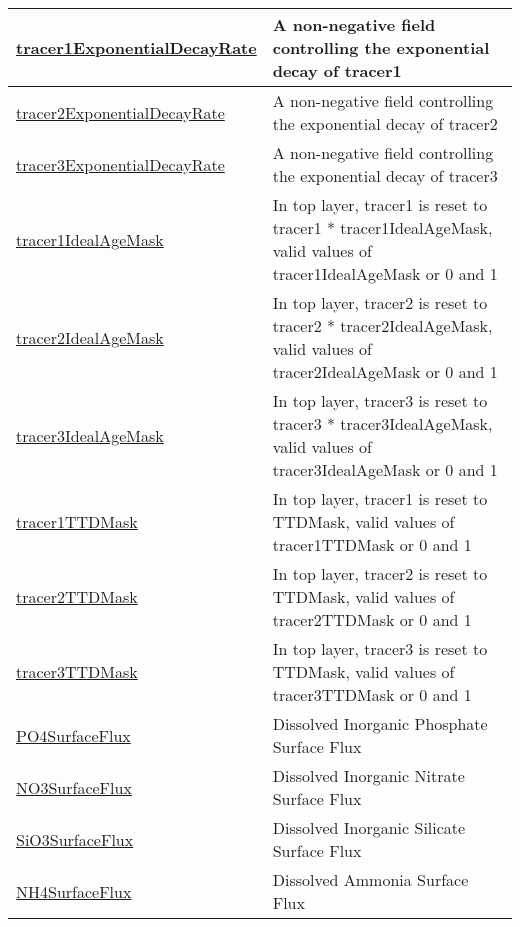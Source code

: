 {\begin{center}
\begin{longtable}{| p{2.0in} | p{4.0in} |}
    \hline
    \hyperref[subsec:var_sec_forcing_tracer1ExponentialDecayRate]{tracer1ExponentialDecayRate} & A non-negative field controlling the exponential decay of tracer1 \\
    \hline
    \hyperref[subsec:var_sec_forcing_tracer2ExponentialDecayRate]{tracer2ExponentialDecayRate} & A non-negative field controlling the exponential decay of tracer2 \\
    \hline
    \hyperref[subsec:var_sec_forcing_tracer3ExponentialDecayRate]{tracer3ExponentialDecayRate} & A non-negative field controlling the exponential decay of tracer3 \\
    \hline
    \hyperref[subsec:var_sec_forcing_tracer1IdealAgeMask]{tracer1IdealAgeMask} & In top layer, tracer1 is reset to tracer1 * tracer1IdealAgeMask, valid values of tracer1IdealAgeMask or 0 and 1 \\
    \hline
    \hyperref[subsec:var_sec_forcing_tracer2IdealAgeMask]{tracer2IdealAgeMask} & In top layer, tracer2 is reset to tracer2 * tracer2IdealAgeMask, valid values of tracer2IdealAgeMask or 0 and 1 \\
    \hline
    \hyperref[subsec:var_sec_forcing_tracer3IdealAgeMask]{tracer3IdealAgeMask} & In top layer, tracer3 is reset to tracer3 * tracer3IdealAgeMask, valid values of tracer3IdealAgeMask or 0 and 1 \\
    \hline
    \hyperref[subsec:var_sec_forcing_tracer1TTDMask]{tracer1TTDMask} & In top layer, tracer1 is reset to TTDMask, valid values of tracer1TTDMask or 0 and 1 \\
    \hline
    \hyperref[subsec:var_sec_forcing_tracer2TTDMask]{tracer2TTDMask} & In top layer, tracer2 is reset to TTDMask, valid values of tracer2TTDMask or 0 and 1 \\
    \hline
    \hyperref[subsec:var_sec_forcing_tracer3TTDMask]{tracer3TTDMask} & In top layer, tracer3 is reset to TTDMask, valid values of tracer3TTDMask or 0 and 1 \\
    \hline
    \hyperref[subsec:var_sec_forcing_PO4SurfaceFlux]{PO4SurfaceFlux} & Dissolved Inorganic Phosphate Surface Flux \\
    \hline
    \hyperref[subsec:var_sec_forcing_NO3SurfaceFlux]{NO3SurfaceFlux} & Dissolved Inorganic Nitrate Surface Flux \\
    \hline
    \hyperref[subsec:var_sec_forcing_SiO3SurfaceFlux]{SiO3SurfaceFlux} & Dissolved Inorganic Silicate Surface Flux \\
    \hline
    \hyperref[subsec:var_sec_forcing_NH4SurfaceFlux]{NH4SurfaceFlux} & Dissolved Ammonia Surface Flux \\

\end{longtable}
\end{center}}
